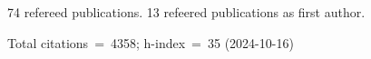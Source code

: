 74 refereed publications. 13 refeered publications as first author.

Total citations~=~4358; h-index~=~35 (2024-10-16)